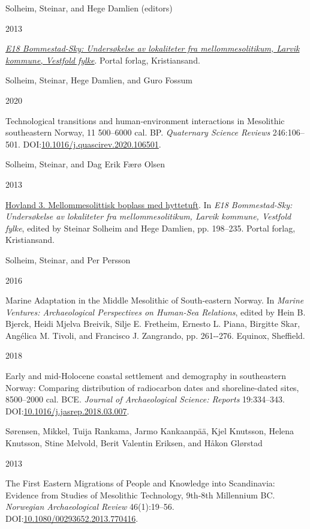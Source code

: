 \documentclass[
  a4paper,
  oneside]{uiophdthesis}
\newlength{\cslhangindent}
\newlength{\csllabelwidth}
\newlength{\cslentryspacingunit} %
\newenvironment{CSLReferences}[2] %
 {%
  \setlength{\parindent}{0pt}
  \ifodd #1
  \let\oldpar\par
  \def\par{\hangindent=\cslhangindent\oldpar}
  \fi
  \setlength{\parskip}{#2\cslentryspacingunit}
 }%
 {}
\newcommand{\CSLBlock}[1]{#1\hfill\break}
\newcommand{\CSLLeftMargin}[1]{\parbox[t]{\csllabelwidth}{#1}}
\newcommand{\CSLRightInline}[1]{\parbox[t]{\linewidth - \csllabelwidth}{#1}\break}
\begin{document}
\begin{CSLReferences}{0}{0}
\leavevmode{}%
\CSLBlock{Solheim, Steinar, and Hege Damlien (editors)}
\CSLLeftMargin{ 2013}
\CSLRightInline{\emph{\href{https://doi.org/10.23865/noasp.53}{{E18 Bommestad-Sky: Undersøkelse av lokaliteter fra mellommesolitikum, Larvik kommune, Vestfold fylke}}}. Portal forlag, Kristiansand.}

\leavevmode{}%
\CSLBlock{Solheim, Steinar, Hege Damlien, and Guro Fossum}
\CSLLeftMargin{ 2020}
\CSLRightInline{Technological transitions and human-environment interactions in Mesolithic southeastern Norway, 11 500--6000 cal. BP. \emph{Quaternary Science Reviews} 246:106--501. DOI:\href{https://doi.org/10.1016/j.quascirev.2020.106501}{10.1016/j.quascirev.2020.106501}.}

\leavevmode{}%
\CSLBlock{Solheim, Steinar, and Dag Erik Færø Olsen}
\CSLLeftMargin{ 2013}
\CSLRightInline{\href{https://doi.org/10.23865/noasp.53}{{Hovland 3. Mellommesolittisk boplass med hyttetuft}}. In \emph{{E18 Bommestad-Sky: Undersøkelse av lokaliteter fra mellommesolitikum, Larvik kommune, Vestfold fylke}}, edited by Steinar Solheim and Hege Damlien, pp. 198--235. Portal forlag, Kristiansand.}

\leavevmode{}%
\CSLBlock{Solheim, Steinar, and Per Persson}
\CSLLeftMargin{ 2016}
\CSLRightInline{{Marine Adaptation in the Middle Mesolithic of South-eastern Norway}. In \emph{{Marine Ventures: Archaeological Perspectives on Human-Sea Relations}}, edited by Hein B. Bjerck, Heidi Mjelva Breivik, Silje E. Fretheim, Ernesto L. Piana, Birgitte Skar, Angélica M. Tivoli, and Francisco J. Zangrando, pp. 261-\/-276. Equinox, Sheffield.}

\leavevmode{}%
\CSLLeftMargin{ 2018 }
\CSLRightInline{Early and mid-Holocene coastal settlement and demography in southeastern Norway: Comparing distribution of radiocarbon dates and shoreline-dated sites, 8500--2000 cal. BCE. \emph{Journal of Archaeological Science: Reports} 19:334--343. DOI:\href{https://doi.org/10.1016/j.jasrep.2018.03.007}{10.1016/j.jasrep.2018.03.007}.}

\leavevmode{}%
\CSLBlock{Sørensen, Mikkel, Tuija Rankama, Jarmo Kankaanpää, Kjel Knutsson, Helena Knutsson, Stine Melvold, Berit Valentin Eriksen, and Håkon Glørstad}
\CSLLeftMargin{ 2013}
\CSLRightInline{{The First Eastern Migrations of People and Knowledge into Scandinavia: Evidence from Studies of Mesolithic Technology, 9th-8th Millennium BC}. \emph{Norwegian Archaeological Review} 46(1):19--56. DOI:\href{https://doi.org/10.1080/00293652.2013.770416}{10.1080/00293652.2013.770416}.}


\end{CSLReferences}
\end{document}
